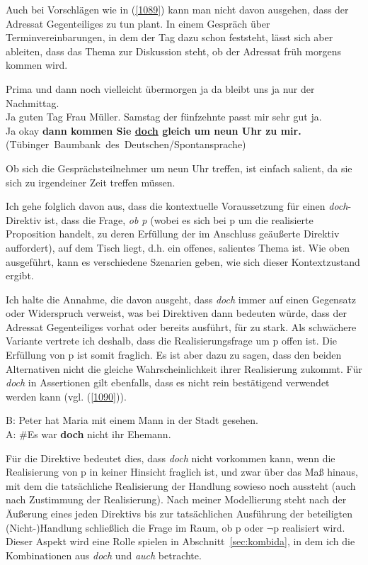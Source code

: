 {Auch bei Vorschlägen wie in (\ref{1089}) kann man nicht davon ausgehen, dass der Adressat Gegenteiliges zu tun plant. In einem Gespräch über Terminvereinbarungen, in dem der Tag dazu schon feststeht, lässt sich aber ableiten, dass das Thema zur Diskussion steht, ob der Adressat früh morgens kommen wird. 

\begin{exe}
	\ex\label{1089} 
	\scriptsize
	Prima und dann noch vielleicht übermorgen ja da bleibt uns ja nur der Nachmittag.\\
	
	Ja guten Tag Frau Müller. Samstag der fünfzehnte passt mir sehr gut ja.\\
	
	Ja okay \textbf{dann kommen Sie \underline{doch} gleich um neun Uhr zu mir.}
	\newline
	\hbox{}\hfill\hbox{(Tübinger Baumbank des Deutschen/Spontansprache)} 				     
\end{exe}
Ob sich die Gesprächsteilnehmer um neun Uhr treffen, ist einfach salient, da sie sich zu irgendeiner Zeit treffen müssen. 

Ich gehe folglich davon aus, dass die kontextuelle Voraussetzung für einen \textit{doch}-Direktiv ist, dass die Frage, \textit{ob p} (wobei es sich bei p um die realisierte Proposition handelt, zu deren Erfüllung der im Anschluss geäußerte Direktiv auffordert), auf dem Tisch liegt, d.h. ein offenes, salientes Thema ist. Wie oben ausgeführt, kann es verschiedene Szenarien geben, wie sich dieser Kontextzu\-stand ergibt.

Ich halte die Annahme, die davon ausgeht, dass \textit{doch} immer auf einen Gegensatz oder Widerspruch verweist, was bei Direktiven dann bedeuten würde, dass der Adressat Gegenteiliges vorhat oder bereits ausführt, für zu stark. Als schwä\-chere Variante vertrete ich deshalb, dass die Realisierungsfrage um p offen ist. Die Erfüllung von p ist somit fraglich. Es ist aber dazu zu sagen, dass den beiden Alternativen nicht die gleiche Wahrscheinlichkeit ihrer Realisierung zukommt. Für \textit{doch} in Assertionen gilt ebenfalls, dass es nicht rein bestätigend verwendet werden kann (vgl. (\ref{1090})).

\begin{exe}
	\ex\label{1090} 
	B: Peter hat Maria mit einem Mann in der Stadt gesehen.\\
	A: \#Es war \textbf{doch} nicht ihr Ehemann.				     
\end{exe}
Für die Direktive bedeutet dies, dass \textit{doch} nicht vorkommen kann, wenn die Realisierung von p in keiner Hinsicht fraglich ist, und zwar über das Maß hinaus, mit dem die tatsächliche Realisierung der Handlung sowieso noch aussteht (auch nach Zustimmung der Realisierung). Nach meiner Modellierung steht nach der Äußerung eines jeden Direktivs bis zur tatsächlichen Ausführung der beteiligten (Nicht-)Handlung schließlich die Frage im Raum, ob p oder $\neg$p realisiert wird. Dieser Aspekt wird eine Rolle spielen in Abschnitt~\ref{sec:kombida}, in dem ich die Kombinationen aus \textit{doch} und \textit{auch} betrachte.

}
